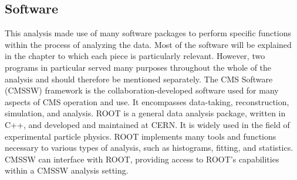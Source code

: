 \subsection{Software}



This analysis made use of many software packages 
to perform specific functions within 
the process of analyzing the data.  
Most of the software will be explained 
in the chapter to which each piece is particularly 
relevant.  
However, two programs in particular 
served many purposes 
throughout the whole of the analysis and 
should therefore be mentioned separately.  
%
The CMS Software (CMSSW) framework is 
the collaboration-developed software 
used for many aspects of CMS operation and use.  
It encompasses data-taking, reconstruction, 
simulation, and analysis.  
%
ROOT is a general data analysis package, 
written in C++, 
and developed and maintained at CERN. 
It is widely used in the field of 
experimental particle physics.  
ROOT implements many tools and functions 
necessary to various types of analysis, 
such as histograms, fitting, 
and statistics.  
CMSSW can interface with ROOT, 
providing access to ROOT's %
capabilities within a CMSSW 
analysis setting.  

